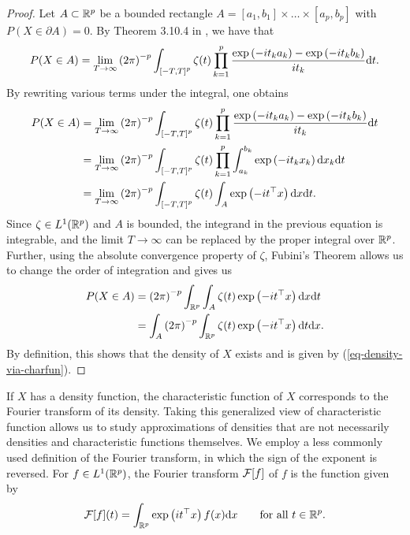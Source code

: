 \begin{proof}
    Let $A \subset \Rp$ be a bounded rectangle $A = [a_1, b_1] \times \ldots \times [a_p, b_p]$ with $P(X \in \partial A) = 0$. By Theorem 3.10.4 in \cite{durrett_2019}, we have that
    \begin{equation*}
        P(X \in A) = \lim_{T \rightarrow \infty} \left(2\pi\right)^{-p}\int_{\left[-T, T\right]^p} \zeta(t) \prod_{k=1}^p \frac{\expf{-it_k a_k} - \expf{-it_k b_k}}{i t_k} \d t.
    \end{equation*}
    By rewriting various terms under the integral, one obtains
    \begin{align*}
        P(X \in A) 
        &= \lim_{T \rightarrow \infty} \left(2\pi\right)^{-p}\int_{\left[-T, T\right]^p} \zeta(t) \prod_{k=1}^p \frac{\expf{-it_k a_k} - \expf{-it_k b_k}}{i t_k} \d t \\
        &= \lim_{T \rightarrow \infty} \left(2\pi\right)^{-p}\int_{\left[-T, T\right]^p} \zeta(t) \prod_{k=1}^p \int_{a_k}^{b_k}\expf{-i t_k x_k} \d x_k \d t \\
        &= \lim_{T \rightarrow \infty} \left(2\pi\right)^{-p}\int_{\left[-T, T\right]^p} \zeta(t) \int_A \expf{-i t^\top x} \d x \d t.
    \end{align*}
    Since $\zeta \in L^1(\Rp)$ and $A$ is bounded, the integrand in the previous equation is integrable, and the limit $T \rightarrow \infty$ can be replaced by the proper integral over $\Rp$. Further, using the absolute convergence property of $\zeta$, Fubini's Theorem allows us to change the order of integration and gives us
    \begin{align*}
        P(X \in A) 
        &= \left(2\pi\right)^{-p}\intRp{t}{\int_A \zeta(t) \expf{-i t^\top x} \d x} \\
        &= \int_A \left(2\pi\right)^{-p} \intRp{t}{\zeta(t) \expf{-i t^\top x} } \d x.
    \end{align*}
    By definition, this shows that the density of $X$ exists and is given by (\ref{eq-density-via-charfun}).
\end{proof}

If $X$ has a density function, the characteristic function of $X$ corresponds to the Fourier transform of its density. Taking this generalized view of characteristic function allows us to study approximations of densities that are not necessarily densities and characteristic functions themselves. We employ a less commonly used definition of the Fourier transform, in which the sign of the exponent is reversed. For $f \in L^1(\Rp)$, the Fourier transform $\F[f]$ of $f$ is the function given by
\begin{equation} \label{eq-fourier-density}
    \F[f](t) = \int_\Rp \expf{it^\top x}f(x)\d x \ \ \ \ \ \ \t{for all } t \in \Rp.
\end{equation}

